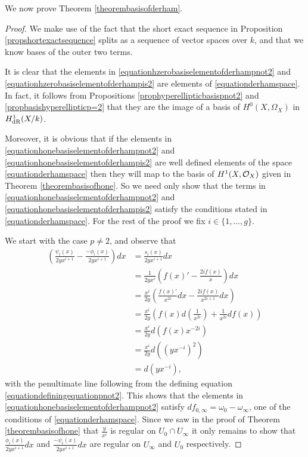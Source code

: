 We now prove Theorem \ref{theorembasisofderham}.

    \begin{proof}
    We make use of the fact that the short exact sequence in Proposition \ref{propshortexactsequence} splits as a sequence of vector spaces over $k$, and that we know bases of the outer two terms.
    
    It is clear that the elements in \eqref{equationhzerobasiselementofderhampnot2} and \eqref{equationhzerobasiselementofderhampis2} are elements of \eqref{equationderhamspace}. 
    In fact, it follows from Propositions \ref{prophyperellipticbasispnot2} and \ref{propbasishyperellipticp=2} that they are the image of a basis of $H^0(X,\Omega_X)$ in $H_{\text {dR}}^1(X/k)$.
    
    Moreover, it is obvious that if the elements in \eqref{equationhonebasiselementofderhampnot2} and \eqref{equationhonebasiselementofderhampis2} are well defined elements of the space \eqref{equationderhamspace} then they will map to the basis of $H^1(X,\mathcal{O}_X)$ given in Theorem \ref{theorembasisofhone}.
    So we need only show that the terms in \eqref{equationhonebasiselementofderhampnot2} and \eqref{equationhonebasiselementofderhampis2} satisfy the conditions stated in \eqref{equationderhamspace}.
    For the rest of the proof we fix $i \in \{1, \ldots ,g\}$.
    
    
    We start with the case $p\neq 2$, and observe that
        \begin{align*}
        \left(  \frac{\psi_i(x)}{2yx^{i+1}}  - \frac{-\phi_i(x)}{2yx^{i+1}} \right) dx & =  \frac{s_i(x)}{2yx^{i+1}} dx \\
        & =  \frac{1}{2yx^i} \left( f(x)' - \frac{2if(x)}{x} \right) dx \\
        & =  \frac{x^i}{2y} \left( \frac{f(x)'}{x^{2i}}dx -\frac{2if(x)}{x^{2i+1}} dx \right) \\
        & =  \frac{x^i}{2y} \left( f(x)d\left(\frac{1}{x^{2i}}\right) + \frac{1}{x^{2i}}df(x) \right) \\
        & =  \frac{x^i}{2y}d(f(x)x^{-2i}) \\
        & =  \frac{x^i}{2y} d\left(\left(yx^{-i}\right)^2\right) \\
        & =  d(yx^{-i}),
        \end{align*}
    with the penultimate line following from the defining equation \eqref{equationdefiningequationpnot2}.
    This shows that the elements in \eqref{equationhonebasiselementofderhampnot2} satisfy $df_{0, \infty} = \omega_0 - \omega_\infty$, one of the conditions of \eqref{equationderhamspace}.
    Since we saw in the proof of Theorem \ref{theorembasisofhone} that $\frac{y}{x^i}$ is regular on $U_0\cap U_\infty$ it only remains to show that $\frac{\phi_i(x)}{2yx^{i+1}}dx$ and $\frac{-\psi_i(x)}{2yx^{i+1}}dx$ are regular on $U_\infty$ and $U_0$ respectively.
    

\end{proof}
